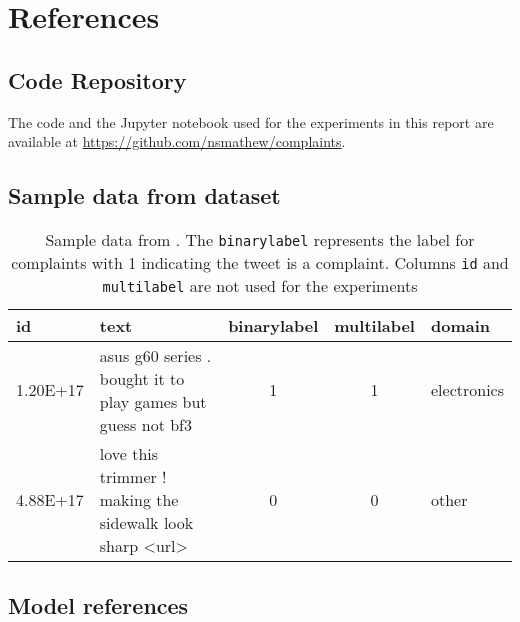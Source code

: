 \chapter{References}

\section{Code Repository}
The code and the Jupyter notebook used for the experiments in this report are available at \url{https://github.com/nsmathew/complaints}.

\section{Sample data from dataset}
\begin{table}[ht]
    \captionsetup{font=small}
    \centering
    \begin{tabularx}{\textwidth}{|l|X|c|c|l|}
        \hline
        \rowcolor[gray]{0.7}
        \textbf{id} & \textbf{text}                                               & \textbf{binarylabel} & \textbf{multilabel} & \textbf{domain} \\
        \hline
        1.20E+17    & asus g60 series . bought it to play games but guess not bf3 & 1                    & 1                   & electronics     \\
        \hline
        4.88E+17    & love this trimmer ! making the sidewalk look sharp <url>    & 0                    & 0                   & other           \\
        \hline
    \end{tabularx}
    \caption{Sample data from \cite{jinModelingSeverityComplaints2021}. The \texttt{binarylabel} represents the label for complaints with 1 indicating the tweet is a complaint. Columns \texttt{id} and \texttt{multilabel} are not used for the experiments}
    \label{tab: apdx_sample_data}
\end{table}

\section{Model references}

